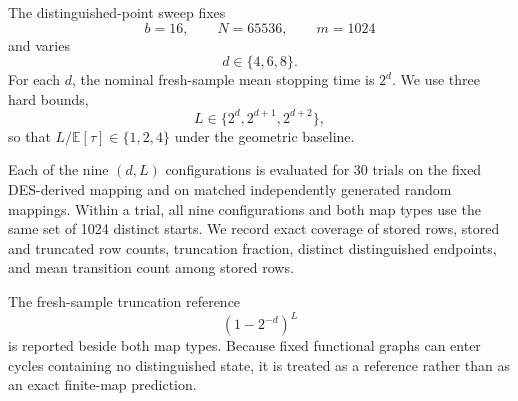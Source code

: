 The distinguished-point sweep fixes
\[
  b=16,\qquad N=65536,\qquad m=1024
\]
and varies
\[
  d\in\{4,6,8\}.
\]
For each $d$, the nominal fresh-sample mean stopping time is $2^d$.  We use
three hard bounds,
\[
  L\in\{2^d,2^{d+1},2^{d+2}\},
\]
so that $L/\mathbb E[\tau]\in\{1,2,4\}$ under the geometric baseline.

Each of the nine $(d,L)$ configurations is evaluated for 30 trials on the
fixed DES-derived mapping and on matched independently generated random
mappings.  Within a trial, all nine configurations and both map types use the
same set of 1024 distinct starts.  We record exact coverage of stored rows,
stored and truncated row counts, truncation fraction, distinct distinguished
endpoints, and mean transition count among stored rows.

The fresh-sample truncation reference
\[
  (1-2^{-d})^L
\]
is reported beside both map types.  Because fixed functional graphs can enter
cycles containing no distinguished state, it is treated as a reference rather
than as an exact finite-map prediction.
